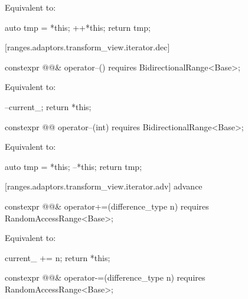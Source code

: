 \begin{itemdescr}
\pnum
\effects Equivalent to:
\begin{codeblock}
auto tmp = *this;
++*this;
return tmp;
\end{codeblock}
\end{itemdescr}

[ranges.adaptors.transform_view.iterator.dec]{}

\begin{itemdecl}
constexpr @@& operator--() requires BidirectionalRange<Base>;
\end{itemdecl}

\begin{itemdescr}
\pnum
\effects Equivalent to:
\begin{codeblock}
--current_;
return *this;
\end{codeblock}
\end{itemdescr}

\begin{itemdecl}
constexpr @@ operator--(int) requires BidirectionalRange<Base>;
\end{itemdecl}

\begin{itemdescr}
\pnum
\effects Equivalent to:
\begin{codeblock}
auto tmp = *this;
--*this;
return tmp;
\end{codeblock}
\end{itemdescr}

[ranges.adaptors.transform_view.iterator.adv]{ advance}

\begin{itemdecl}
constexpr @@& operator+=(difference_type n)
requires RandomAccessRange<Base>;
\end{itemdecl}

\begin{itemdescr}
\pnum
\effects Equivalent to:
\begin{codeblock}
current_ += n;
return *this;
\end{codeblock}
\end{itemdescr}

%
\begin{itemdecl}
constexpr @@& operator-=(difference_type n)
requires RandomAccessRange<Base>;
\end{itemdecl}

